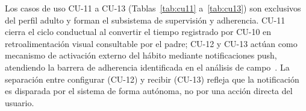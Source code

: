 				Los casos de uso CU-11 a CU-13 (Tablas~\ref{tab:cu11} a~\ref{tab:cu13}) son exclusivos del perfil adulto y forman el subsistema de supervisión y adherencia. CU-11 cierra el ciclo conductual al convertir el tiempo registrado por CU-10 en retroalimentación visual consultable por el padre; CU-12 y CU-13 actúan como mecanismo de activación externo del hábito mediante notificaciones push, atendiendo la barrera de adherencia identificada en el análisis de campo~\cite{Schoeppe2017,VegaDiaz2023}. La separación entre configurar (CU-12) y recibir (CU-13) refleja que la notificación es disparada por el sistema de forma autónoma, no por una acción directa del usuario.
				
				\begingroup
					\setlength{\LTpre}{6pt}\setlength{\LTpost}{6pt}
					\renewcommand{\arraystretch}{1.20}
					\footnotesize
